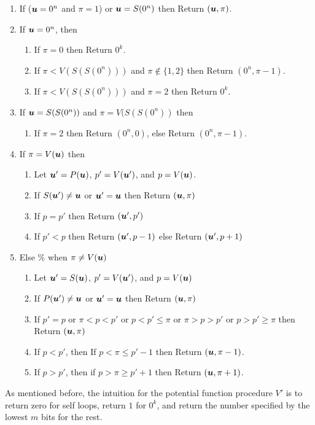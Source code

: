 \documentclass[a4paper,UKenglish]{lipics2}
\theoremstyle{definition}
\newcommand{\uu}{\mbox{\boldmath $u$}}
\begin{document}
\begin{enumerate}
\item If ($\uu=0^n$ and $\pi=1$) or $\uu=S(0^n)$ then Return $(\uu,\pi)$. 
\item If $\uu=0^n$, then 
\begin{enumerate}
\item If $\pi=0$ then Return $0^k$.
\item If $\pi<V(S(S(0^n)))$ and $\pi\notin \{1,2\}$ then Return $(0^n,\pi-1)$.
\item If $\pi<V(S(S(0^n)))$ and $\pi=2$ then Return $0^k$.
\end{enumerate}
\item If $\uu=S(S(0^n))$ and $\pi=V(S(S(0^n))$ then 
\begin{enumerate}
\item If $\pi=2$ then Return $(0^n,0)$, else Return $(0^n,\pi-1)$. 
\end{enumerate}
\item If $\pi=V(\uu)$ then 
\begin{enumerate}
\item Let $\uu'=P(\uu)$, $p'=V(\uu')$, and $p=V(\uu)$. 
\item If $S(\uu')\neq \uu$ or $\uu'=\uu$ then Return $(\uu,\pi)$
\item If $p=p'$ then Return $(\uu',p')$ 
\item If $p'<p$ then Return $(\uu',p-1)$ else Return $(\uu',p+1)$
\end{enumerate}
\item Else \% when $\pi \neq V(\uu)$
\begin{enumerate}
\item Let $\uu'=S(\uu)$, $p'=V(\uu')$, and $p=V(\uu)$
\item If $P(\uu')\neq \uu$ or $\uu'=\uu$ then Return $(\uu,\pi)$
\item If $p'=p$ or $\pi<p< p'$ or $p<p'\le \pi$ or $\pi>p> p'$ or $p>p'\ge \pi$ then Return $(\uu,\pi)$
\item If $p<p'$, then If $p<\pi\le p'-1$ then Return $(\uu,\pi-1)$. 
\item If $p>p'$, then if $p> \pi\ge p'+1$ then Return $(\uu,\pi+1)$. 
\end{enumerate}
\end{enumerate}

As mentioned before, the intuition for the potential function procedure $V'$ is to return zero for self loops, return $1$ for $0^k$, and return the number specified by the lowest $m$ bits for the rest. 
\medskip
\medskip
\end{document}
